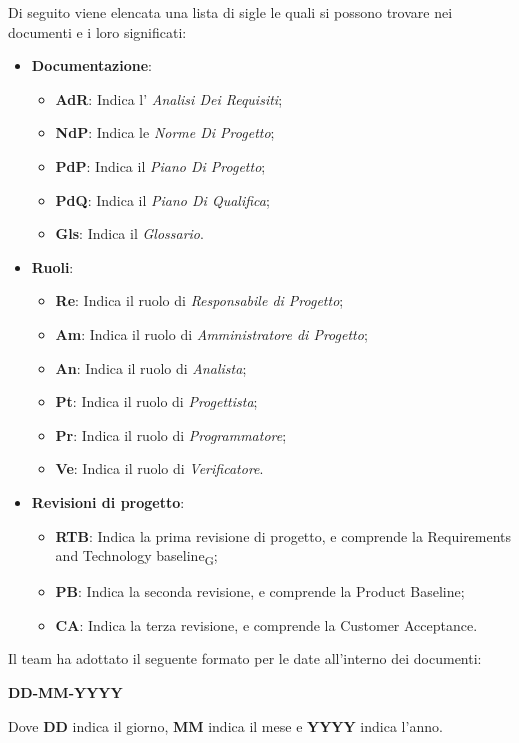 Di seguito viene elencata una lista di sigle le quali si possono trovare nei documenti e i loro significati:
\begin{itemize}
\item \textbf{Documentazione}:
	\begin{itemize}
	\item \textbf{AdR}: Indica l' \textit{Analisi Dei Requisiti};
	\item \textbf{NdP}: Indica le \textit{Norme Di Progetto};
	\item \textbf{PdP}: Indica il \textit{Piano Di Progetto};
	\item \textbf{PdQ}: Indica il \textit{Piano Di Qualifica};
	\item \textbf{Gls}: Indica il \textit{Glossario}.
	\end{itemize}
\item \textbf{Ruoli}:
	\begin{itemize}
	\item \textbf{Re}: Indica il ruolo di \textit{Responsabile di Progetto};
	\item \textbf{Am}: Indica il ruolo di \textit{Amministratore di Progetto};
	\item \textbf{An}: Indica il ruolo di \textit{Analista};
	\item \textbf{Pt}: Indica il ruolo di \textit{Progettista};
	\item \textbf{Pr}: Indica il ruolo di \textit{Programmatore};
	\item \textbf{Ve}: Indica il ruolo di \textit{Verificatore}.
	\end{itemize}
\item \textbf{Revisioni di progetto}:
	\begin{itemize}
		\item \textbf{RTB}: Indica la prima revisione di progetto, e comprende la Requirements and Technology baseline\textsubscript{G};
		\item \textbf{PB}: Indica la seconda revisione, e comprende la Product Baseline;
		\item \textbf{CA}: Indica la terza revisione, e comprende la Customer Acceptance.
	\end{itemize}
\end{itemize}
Il team ha adottato il seguente formato per le date all'interno dei documenti:
\begin{center}
    \large{\textbf{DD-MM-YYYY}}
\end{center}
Dove \textbf{DD} indica il giorno, \textbf{MM} indica il mese e \textbf{YYYY} indica l'anno.

